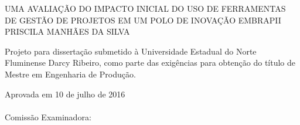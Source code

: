 \begin{folhadeaprovacao}
    \setlength{\ABNTsignthickness}{0.4pt}
    \setlength{\ABNTsignwidth}{15cm}
    \setlength{\ABNTsignskip}{0.9cm}
    \begin{center}
       {\large UMA AVALIAÇÃO DO IMPACTO INICIAL DO USO DE FERRAMENTAS DE GESTÃO DE PROJETOS EM UM POLO DE INOVAÇÃO EMBRAPII} \\ [3.5cm]
       {\large PRISCILA MANHÃES DA SILVA} \\ [1.5cm]
        \hspace{.45\textwidth} %
        \begin{minipage}{0.5\textwidth}
        \begin{espacosimples}
        Projeto para dissertação submetido à Universidade Estadual do Norte Fluminense Darcy Ribeiro, como parte das exigências para obtenção do título de Mestre em Engenharia de Produção.
        \end{espacosimples}
        \end{minipage}
    \end{center}
    {\normalsize Aprovada em 10 de julho de 2016} \\\\
    {\normalsize Comissão Examinadora: }
    \bigbreak
    \bigbreak
    \bigbreak
    \bigbreak
\end{folhadeaprovacao}
